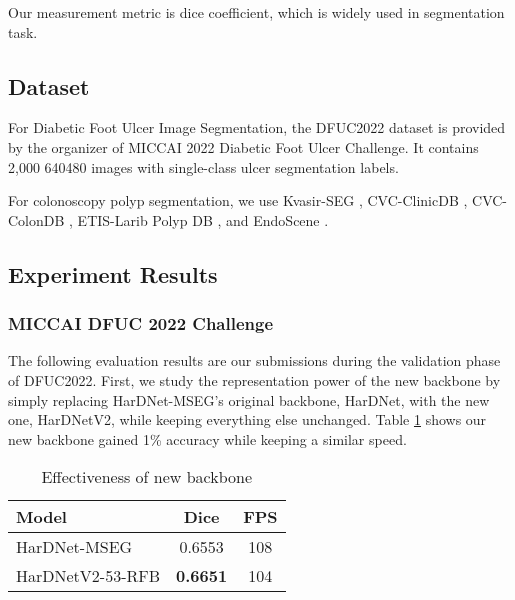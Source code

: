 \documentclass[runningheads]{llncs}
\begin{document}
Our measurement metric is dice coefficient,
which is widely used in segmentation task. 










\subsection{Dataset}

For Diabetic Foot Ulcer Image Segmentation, the DFUC2022 dataset \cite{cassidy2020dfuc2020,goyal2018dfunet,goyal2018robust,goyal2020recognition,kendrick2022translating,yap2021analysis}
is provided by the organizer of MICCAI 2022 Diabetic Foot Ulcer Challenge.
It contains 2,000 640480 images with single-class ulcer segmentation labels.

For colonoscopy polyp segmentation,  we use Kvasir-SEG \cite{kvasir_seg}, CVC-ClinicDB \cite{cvc_clinicdb}, CVC-ColonDB \cite{cvc_colondb}, ETIS-Larib Polyp DB \cite{ETIS}, and EndoScene \cite{EndoScene}.




\subsection{Experiment Results}

\subsubsection{MICCAI DFUC 2022 Challenge}
The following evaluation results are our submissions
during the validation phase of DFUC2022.
First, we study the representation power of the
new backbone by simply replacing
HarDNet-MSEG's original backbone, HarDNet, with the new one, HarDNetV2,
while keeping everything else unchanged.
Table \ref{tab:backbone} shows our new backbone
gained 1\% accuracy while keeping a similar speed.

\begin{table}
\centering
\caption{Effectiveness of new backbone \label{tab:backbone}}
\begin{tabular}{l|c|c}
\hline \hline
Model & Dice & FPS  \\ \hline \hline
{ HarDNet-MSEG }       & 0.6553 &           { 108 } \\ \hline
{ HarDNetV2-53-RFB } & { \bfseries 0.6651 } & 104 \\ \hline
\end{tabular}
\end{table}
\end{document}
